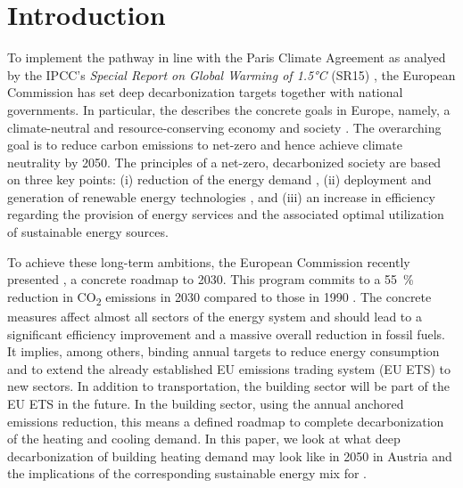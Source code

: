 \section{Introduction}
To implement the pathway in line with the Paris Climate Agreement \cite{agreement2015paris} as analyed by the IPCC's \emph{Special Report on Global Warming of 1.5°C} (SR15) \cite{book}, the European Commission has set deep decarbonization targets together with national governments. In particular, the  describes the concrete goals in Europe, namely, a climate-neutral and resource-conserving economy and society \cite{kemfert2019green}\deleted{)}. The overarching goal is to reduce carbon emissions to net-zero and hence achieve climate neutrality by 2050. The principles of a net-zero, decarbonized society are based on three key points: (i) reduction of the energy demand \cite{grubler2018low}\deleted{)}, (ii) deployment and generation of renewable energy technologies \cite{bakhtavar2020assessment}\deleted{)}, and (iii) an increase in efficiency regarding the provision of energy services and the associated optimal utilization of sustainable energy sources.\vspace{0.3cm}

To achieve these long-term ambitions, the European Commission recently presented , a concrete roadmap to 2030. This program commits to a \SI{55}{\%} reduction in CO\textsubscript{2} emissions in 2030 compared to  those in 1990 \cite{european_commission_european_2019}. The concrete measures affect almost all sectors of the energy system and should lead to a significant efficiency improvement and a massive overall reduction in fossil fuels. It implies, among others, binding annual targets to reduce energy consumption and to extend the already established EU emissions trading system (EU ETS) to new sectors. In addition to transportation, the building sector will be part of the EU ETS in the future. In the building sector, using the annual anchored emissions reduction, this means a defined roadmap to complete decarbonization of the heating and cooling demand. In this paper, we look at what deep decarbonization of building heating demand may look like in 2050 in Austria and the implications of the corresponding sustainable energy mix for .

